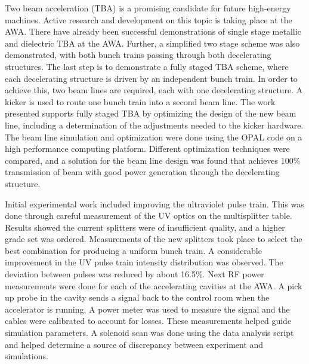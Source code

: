 
Two beam acceleration (TBA) is a promising candidate for future high-energy machines. 
Active research and development on this topic is taking place at the AWA. 
There have already been successful demonstrations of single stage metallic and dielectric TBA at the AWA. 
Further, a simplified two stage scheme was also demonstrated, with both bunch trains passing through both decelerating structures. 
The last step is to demonstrate a fully staged TBA scheme, where each decelerating structure is driven by an independent bunch train.  
In order to achieve this, two beam lines are required, each with one decelerating structure.   
A kicker is used to route one bunch train into a second beam line. 
The work presented supports fully staged TBA by optimizing the design of the new beam line, 
including a determination of the adjustments needed to the kicker hardware.  
The beam line simulation and optimization were done using the OPAL code on a high performance computing platform.  
Different optimization techniques were compared, and a solution for the beam line design was found that achieves 
100\% transmission of beam with good power generation through the decelerating structure. 

Initial experimental work included improving the ultraviolet pulse train. 
This was done through careful measurement of the UV optics on the multisplitter table. 
Results showed the current splitters were of insufficient quality, and a higher grade set was ordered. 
Measurements of the new splitters took place to select the best combination for producing a uniform bunch train.
A considerable improvement in the UV pulse train intensity distribution was observed. 
The deviation between pulses was reduced by about 16.5\%.
Next RF power measurements were done for each of the accelerating cavities at the AWA. 
A pick up probe in the cavity sends a signal back to the control room when the accelerator is running. 
A power meter was used to measure the signal and the cables were calibrated to account for losses.  
These measurements helped guide simulation parameters. A solenoid scan was done using the data analysis script
and helped determine a source of discrepancy between experiment and simulations.

